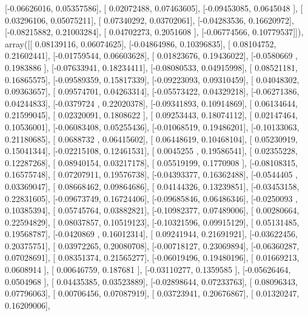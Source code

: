 \documentclass{article}
\begin{document}
       [-0.06626016,  0.05357586],
       [ 0.02072488,  0.07463605],
       [-0.09453085,  0.0645048 ],
       [ 0.03296106,  0.05075211],
       [ 0.07340292,  0.03702061],
       [-0.04283536,  0.16620972],
       [-0.08215882,  0.21003284],
       [ 0.04702273,  0.2051608 ],
       [-0.06774566,  0.10779537]]), array([[ 0.08139116,  0.06074625],
       [-0.04864986,  0.10396835],
       [ 0.08104752,  0.21602441],
       [-0.01759544,  0.06603628],
       [ 0.01823676,  0.19436022],
       [-0.0580669 ,  0.1983886 ],
       [-0.07633941,  0.18234411],
       [-0.08080533,  0.04915998],
       [ 0.08521181,  0.16865575],
       [-0.09589359,  0.15817339],
       [-0.09223093,  0.09310459],
       [ 0.04048302,  0.09363657],
       [ 0.09574701,  0.04263314],
       [-0.05573422,  0.04329218],
       [-0.06271386,  0.04244833],
       [-0.0379724 ,  0.22020378],
       [-0.09341893,  0.10914869],
       [ 0.06134644,  0.21599045],
       [ 0.02320091,  0.1808622 ],
       [ 0.09253443,  0.18074112],
       [ 0.02147464,  0.10536001],
       [-0.06083408,  0.05255436],
       [-0.01068519,  0.19486201],
       [-0.10133063,  0.21180685],
       [ 0.0688732 ,  0.06415602],
       [ 0.06448619,  0.10468104],
       [ 0.05230919,  0.15041344],
       [-0.02215108,  0.12461531],
       [ 0.0045255 ,  0.19586541],
       [ 0.02355228,  0.12287268],
       [ 0.08940154,  0.03217178],
       [ 0.05519199,  0.1770908 ],
       [-0.08108315,  0.16575748],
       [ 0.07207911,  0.19576738],
       [-0.04393377,  0.16362488],
       [-0.0544405 ,  0.03369047],
       [ 0.08668462,  0.09864686],
       [ 0.04144326,  0.13239851],
       [-0.03453158,  0.22831605],
       [-0.09673749,  0.16724406],
       [-0.09685846,  0.06486346],
       [-0.0250093 ,  0.10385394],
       [ 0.05745764,  0.03882821],
       [-0.10982377,  0.07489006],
       [ 0.00280664,  0.22594829],
       [ 0.08037857,  0.10519123],
       [-0.10321596,  0.09915129],
       [ 0.05131485,  0.19568787],
       [-0.0420869 ,  0.16012314],
       [ 0.09241944,  0.21691921],
       [-0.03622456,  0.20375751],
       [ 0.03972265,  0.20080708],
       [-0.00718127,  0.23069894],
       [-0.06360287,  0.07028691],
       [ 0.08351374,  0.21565277],
       [-0.06019496,  0.19480196],
       [ 0.01669213,  0.0608914 ],
       [ 0.00646759,  0.187681  ],
       [-0.03110277,  0.1359585 ],
       [-0.05626464,  0.0504968 ],
       [ 0.04435385,  0.03523889],
       [-0.02898644,  0.07233763],
       [ 0.08096343,  0.07796063],
       [ 0.00706456,  0.07087919],
       [ 0.03723941,  0.20676867],
       [ 0.01320247,  0.16209006],
\end{document}
